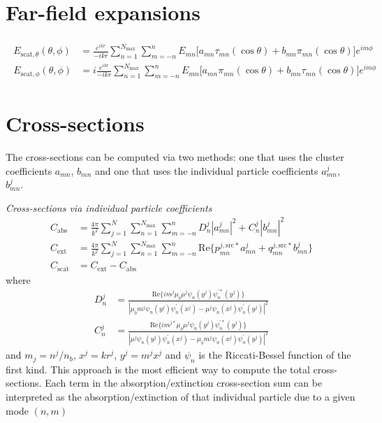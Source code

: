 \documentclass[11pt]{article}
\begin{document}
\section{Far-field expansions}

\begin{align}
\begin{split}
    E_{\text{scat},\theta}(\theta,\phi) &= \frac{e^{ikr}}{-ikr} \sum_{n=1}^{N_\text{max}} \sum_{m=-n}^{n}
    E_{mn} \big[a_{mn}\tau_{mn}(\cos\theta) + b_{mn}\pi_{mn}(\cos\theta)\big] e^{im\phi} \\
    E_{\text{scat},\phi}(\theta,\phi) &= i\frac{e^{ikr}}{-ikr} \sum_{n=1}^{N_\text{max}} \sum_{m=-n}^{n}
    E_{mn} \big[a_{mn}\pi_{mn}(\cos\theta) + b_{mn}\tau_{mn}(\cos\theta)\big] e^{im\phi}
\end{split}
\end{align}

\section{Cross-sections}

The cross-sections can be computed via two methods: one that uses the cluster coefficients $a_{mn}$, $b_{mn}$ and one that uses the individual particle coefficients $a_{mn}^j$, $b_{mn}^j$.

\hfill

\textit{Cross-sections via individual particle coefficients} \cite{xu1997electromagnetic}
\begin{subequations}
\begin{align}
    C_\text{abs} &= \frac{4\pi}{k^2} \sum_{j=1}^N \sum_{n=1}^{N_\text{max}} \sum_{m=-n}^{n}
    D_n^j|a_{mn}^j|^2 + C_n^j|b_{mn}^j|^2 \\
    C_\text{ext} &= \frac{4\pi}{k^2} \sum_{j=1}^N \sum_{n=1}^{N_\text{max}} \sum_{m=-n}^{n}
    \text{Re} \bigg\{ p_{mn}^{j,\text{src}*} a_{mn}^j 
    + q_{mn}^{j,\text{src}*}b_{mn}^j \bigg\} \\
    C_\text{scat} &= C_\text{ext} - C_\text{abs}
\end{align}
\end{subequations}
where
\begin{subequations}
\begin{align}
    D_n^j &= \frac{\text{Re}\{ im^j \mu_b \mu^j \psi_n(y^j)\psi_n^{\prime *}(y^j)\}}
    {|\mu_b m^j \psi_n(y^j)\psi_n^\prime(x^j) - \mu^j \psi_n(x^j)\psi_n^\prime(y^j)|^2} \\
    C_n^j &= \frac{\text{Re}\{ im^{j*} \mu_b \mu^j \psi_n(y^j)\psi_n^{\prime *}(y^j)\}}
    {|\mu^j \psi_n(y^j)\psi_n^\prime(x^j) - \mu_b m^j \psi_n(x^j)\psi_n^\prime(y^j)|^2}
\end{align}
\end{subequations}
and $m_j = n^j/n_b$, $x^j = k r^j$, $y^j = m^jx^j$ and $\psi_n$ is the Riccati-Bessel function of the first kind.
This approach is the most efficient way to compute the total cross-sections.
Each term in the absorption/extinction cross-section sum can be interpreted as the absorption/extinction of that individual particle due to a given mode $(n,m)$
\end{document}
